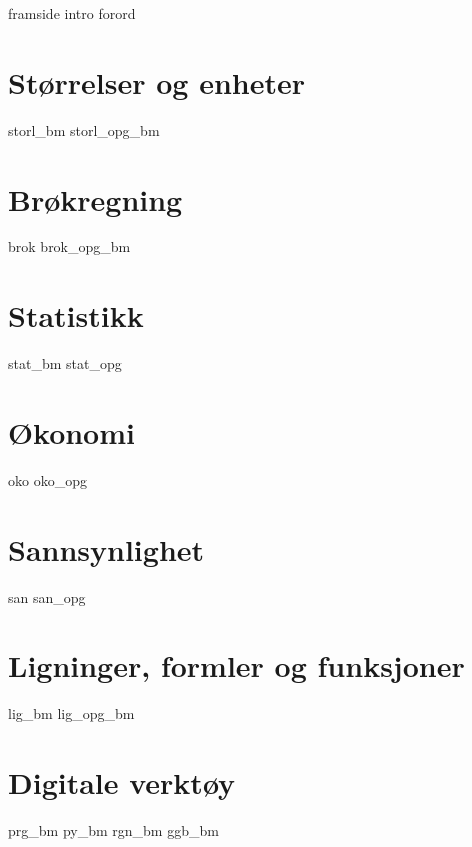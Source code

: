 




\addto\captionsenglish{\renewcommand{\figurename}{Figur}}
\makeatletter
\addto\captionsenglish{\renewcommand{\chaptername}{Kapittel}}
\addto\captionsenglish{\renewcommand{\contentsname}{Innhold}}




{framside}
{intro}
{forord}
\newpage
\tableofcontents

\chapter{Størrelser og enheter \label{Storlogenh}}
\newpage

{storl_bm}
{storl_opg_bm}

\chapter{Brøkregning \label{BrokAM}}
\newpage
{brok}
\newpage
{brok_opg_bm}

\chapter{Statistikk \label{Statistikk}}
\newpage
{stat_bm}
{stat_opg}

\chapter{Økonomi \label{Okonomi}}
\newpage
{oko}
{oko_opg}

\chapter{Sannsynlighet \label{Sannsyn}} 
\newpage
{san}
{san_opg}

\chapter{Ligninger, formler og funksjoner \label{LigningerAM}}
\newpage
{lig_bm}
{lig_opg_bm}

\chapter{Digitale verktøy \label{Dig}}
{prg_bm}
{py_bm}
{rgn_bm}	
{ggb_bm}	

